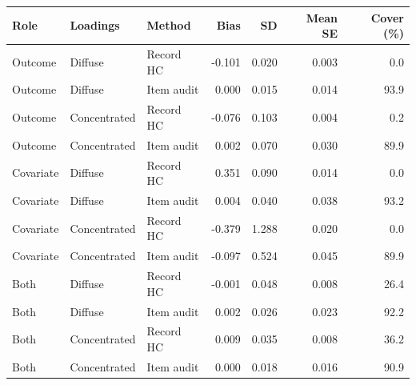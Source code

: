 \begin{tabular}{lllrrrr}
\toprule
Role & Loadings & Method & Bias & SD & Mean SE & Cover (\%) \\
\midrule
Outcome & Diffuse & Record HC & -0.101 & 0.020 & 0.003 & 0.0 \\
Outcome & Diffuse & Item audit & 0.000 & 0.015 & 0.014 & 93.9 \\
Outcome & Concentrated & Record HC & -0.076 & 0.103 & 0.004 & 0.2 \\
Outcome & Concentrated & Item audit & 0.002 & 0.070 & 0.030 & 89.9 \\
Covariate & Diffuse & Record HC & 0.351 & 0.090 & 0.014 & 0.0 \\
Covariate & Diffuse & Item audit & 0.004 & 0.040 & 0.038 & 93.2 \\
Covariate & Concentrated & Record HC & -0.379 & 1.288 & 0.020 & 0.0 \\
Covariate & Concentrated & Item audit & -0.097 & 0.524 & 0.045 & 89.9 \\
Both & Diffuse & Record HC & -0.001 & 0.048 & 0.008 & 26.4 \\
Both & Diffuse & Item audit & 0.002 & 0.026 & 0.023 & 92.2 \\
Both & Concentrated & Record HC & 0.009 & 0.035 & 0.008 & 36.2 \\
Both & Concentrated & Item audit & 0.000 & 0.018 & 0.016 & 90.9 \\
\bottomrule
\end{tabular}
